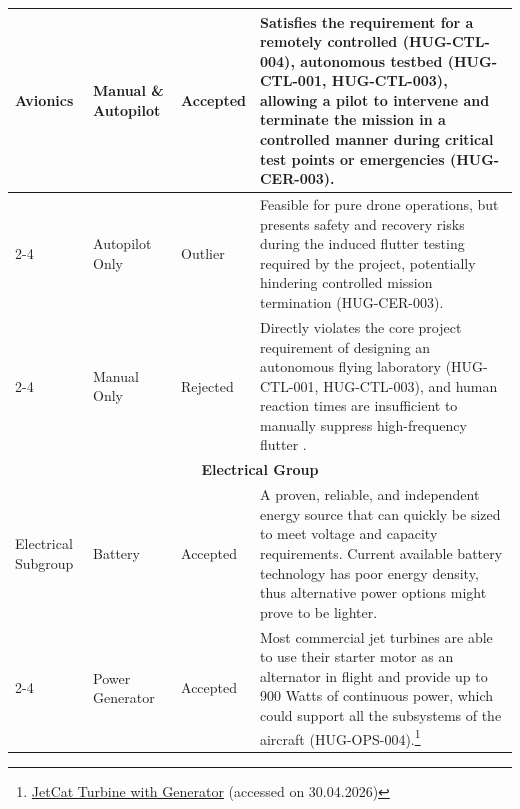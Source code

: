 \begin{longtable}{|p{1.6cm}|p{2.3cm}|p{1.6cm}|p{9.5cm}|}
\hline
Avionics & Manual \& Autopilot & Accepted & Satisfies the requirement for a remotely controlled (HUG-CTL-004), autonomous testbed (HUG-CTL-001, HUG-CTL-003), allowing a pilot to intervene and terminate the mission in a controlled manner during critical test points or emergencies (HUG-CER-003). \\
\cline{2-4}
\multicolumn{1}{|l|}{} & Autopilot Only & Outlier & Feasible for pure drone operations, but presents safety and recovery risks during the induced flutter testing required by the project, potentially hindering controlled mission termination (HUG-CER-003). \\
\cline{2-4}
\multicolumn{1}{|l|}{} & Manual Only & Rejected & Directly violates the core project requirement of designing an autonomous flying laboratory (HUG-CTL-001, HUG-CTL-003), and human reaction times are insufficient to manually suppress high-frequency flutter \cite{livne}. \\
\hline
\multicolumn{4}{|c|}{\textbf{Electrical Group}} \\
\hline
Electrical Subgroup & Battery & Accepted & A proven, reliable, and independent energy source that can quickly be sized to meet voltage and capacity requirements. Current available battery technology has poor energy density, thus alternative power options might prove to be lighter.\\
\cline{2-4}
\multicolumn{1}{|l|}{} & Power Generator & Accepted & Most commercial jet turbines are able to use their starter motor as an alternator in flight and provide up to 900 Watts of continuous power, which could support all the subsystems of the aircraft (HUG-OPS-004).\footnote{\href{https://www.jetcat.de/en/productdetails/produkte/jetcat/produkte/Professionell/P550\%20PRO-S\%20-\%20GH}{JetCat Turbine with Generator} (accessed on 30.04.2026)} \\
\hline


\end{longtable}
